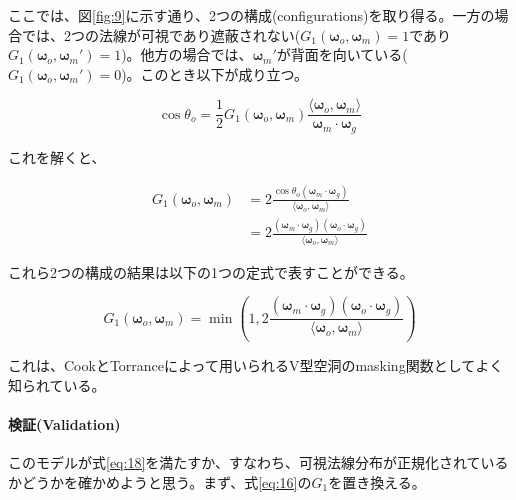 \documentclass[a4j,xelatex,ja=standard]{bxjsarticle}
\begin{document}
ここでは、図\ref{fig:9}に示す通り、2つの構成(configurations)を取り得る。一方の場合では、2つの法線が可視であり遮蔽されない($G_1(\boldsymbol{\omega}_o, \boldsymbol{\omega}_m) = 1$であり$G_1(\boldsymbol{\omega}_o, \boldsymbol{\omega}_m') = 1$)。他方の場合では、$\boldsymbol{\omega}_m'$が背面を向いている($G_1(\boldsymbol{\omega}_o, \boldsymbol{\omega}_m') = 0$)。このとき以下が成り立つ。

\begin{equation}
    \cos\theta_o = \frac{1}{2}G_1(\boldsymbol{\omega}_o, \boldsymbol{\omega}_m) \frac{\langle \boldsymbol{\omega}_o, \boldsymbol{\omega}_m \rangle}{\boldsymbol{\omega}_m \cdot \boldsymbol{\omega}_g}
    \label{eq:47}
\end{equation}

これを解くと、

\begin{equation}
    \begin{split}
        G_1(\boldsymbol{\omega}_o, \boldsymbol{\omega}_m)
        &= 2 \frac{\cos\theta_o (\boldsymbol{\omega}_m \cdot \boldsymbol{\omega}_g)}{\langle \boldsymbol{\omega}_o, \boldsymbol{\omega}_m \rangle} \\
        &= 2 \frac{(\boldsymbol{\omega}_m \cdot \boldsymbol{\omega}_g) (\boldsymbol{\omega}_o \cdot \boldsymbol{\omega}_g)}{\langle \boldsymbol{\omega}_o, \boldsymbol{\omega}_m \rangle}
    \end{split}
    \label{eq:48}
\end{equation}

これら2つの構成の結果は以下の1つの定式で表すことができる。

\begin{equation}
    G_1(\boldsymbol{\omega}_o, \boldsymbol{\omega}_m) = \min \left( 1, 2 \frac{(\boldsymbol{\omega}_m \cdot \boldsymbol{\omega}_g) (\boldsymbol{\omega}_o \cdot \boldsymbol{\omega}_g)}{\langle \boldsymbol{\omega}_o, \boldsymbol{\omega}_m \rangle} \right)
    \label{eq:49}
\end{equation}

これは、CookとTorranceによって用いられるV型空洞のmasking関数としてよく知られている。

\paragraph{検証(Validation)}

このモデルが式\eqref{eq:18}を満たすか、すなわち、可視法線分布が正規化されているかどうかを確かめようと思う。まず、式\eqref{eq:16}の$G_1$を置き換える。
\end{document}
